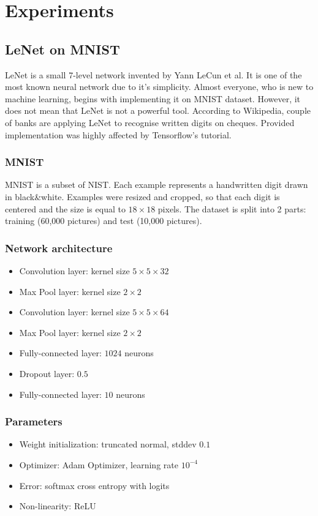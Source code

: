 \documentclass[licencjacka]{pracamgr}
\begin{document}
\chapter{Experiments}
	\section{LeNet on MNIST}
		LeNet is a small 7-level network invented by Yann LeCun et al. It is one of the most known neural network due to it’s simplicity. Almost everyone, who is new to machine learning, begins with implementing it on MNIST dataset. However, it does not mean that LeNet is not a powerful tool. According to Wikipedia, couple of banks are applying LeNet to recognise written digits on cheques. Provided implementation was highly affected by Tensorflow's tutorial. \\
		\subsection{MNIST}
			MNIST is a subset of NIST. Each example represents a handwritten digit drawn in black\&white. Examples were resized and cropped, so that each digit is centered and the size is equal to $18\times18$ pixels. The dataset is split into 2 parts: training (60,000 pictures) and test (10,000 pictures).
		\subsection{Network architecture}
			\begin{itemize}
			\item Convolution layer: kernel size $5 \times 5 \times 32$
			\item Max Pool layer: kernel size $2 \times 2$
			\item Convolution layer: kernel size $5 \times 5 \times 64$
			\item Max Pool layer: kernel size $2 \times 2$
			\item Fully-connected layer: $1024$ neurons
			\item Dropout layer: $0.5$
			\item Fully-connected layer: $10$ neurons
			\end{itemize}
		\subsection{Parameters}
			\begin{itemize}
			\item Weight initialization: truncated normal, stddev $0.1$
			\item Optimizer: Adam Optimizer, learning rate $10^{-4}$
			\item Error: softmax cross entropy with logits
			\item Non-linearity: ReLU
			\end{itemize}
\end{document}
